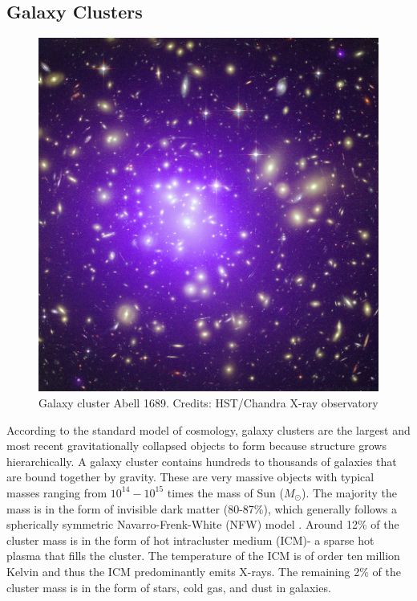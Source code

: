\subsection{Galaxy Clusters}
\begin{figure}[ht]
\includegraphics[width = \columnwidth]{figs/Abell_1689.jpg}
\caption{Galaxy cluster Abell 1689. Credits: HST/Chandra X-ray observatory}
\label{cluster}
\end{figure}
According to the standard model of cosmology, galaxy clusters are the largest and most recent gravitationally collapsed objects to form because structure grows hierarchically. 
A galaxy cluster contains hundreds to thousands of galaxies that are bound together by gravity.
These are very massive objects with typical masses ranging from $10^{14} - 10^{15} $ times the mass of Sun ($M_{\odot}$). %
The majority the mass is in the form of invisible dark matter (80-87\%), which generally follows a spherically symmetric Navarro-Frenk-White (NFW) model  \citep{navarro97}. 
Around 12\% of the cluster mass is in the form of hot intracluster medium (ICM)- a sparse hot plasma that fills the cluster. 
The temperature of the ICM is of order ten million Kelvin and thus the ICM predominantly emits X-rays. 
The remaining 2\% of the cluster mass is in the form of stars, cold gas, and dust in galaxies.

